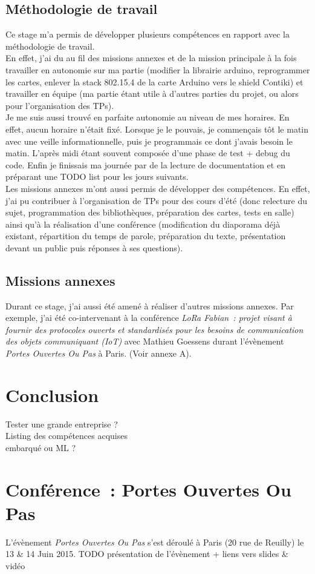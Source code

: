 \documentclass{article}
\begin{document}
\subsection{Méthodologie de travail}
Ce stage m'a permis de développer plusieurs compétences en rapport avec la méthodologie de travail.\\
En effet, j'ai du au fil des missions annexes et de la mission principale à la fois travailler en autonomie sur ma partie (modifier la librairie arduino, reprogrammer les cartes, enlever la stack 802.15.4 de la carte Arduino vers le shield Contiki) et travailler en équipe (ma partie étant utile à d'autres parties du projet, ou alors pour l'organisation des TPs).\\
Je me suis aussi trouvé en parfaite autonomie au niveau de mes horaires. En effet, aucun horaire n'était fixé. Lorsque je le pouvais, je commençais tôt le matin avec une veille informationnelle, puis je programmais ce dont j'avais besoin le matin. L'après midi étant souvent composée d'une phase de test + debug du code. Enfin je finissais ma journée par de la lecture de documentation et en préparant une TODO list pour les jours suivants.\\
Les missions annexes m'ont aussi permis de développer des compétences. En effet, j'ai pu contribuer à l'organisation de TPs pour des cours d'été (donc relecture du sujet, programmation des bibliothèques, préparation des cartes, tests en salle) ainsi qu'à la réalisation d'une conférence (modification du diaporama déjà existant, répartition du temps de parole, préparation du texte, présentation devant un public puis réponses à ses questions).
\subsection{Missions annexes}
Durant ce stage, j'ai aussi été amené à réaliser d'autres missions annexes. Par exemple, j'ai été co-intervenant à la conférence \emph{LoRa Fabian~:  projet visant à fournir des protocoles ouverts et standardisés pour les besoins de communication des objets communiquant (IoT)} avec Mathieu Goessens durant l'évènement \emph{Portes Ouvertes Ou Pas} à Paris. (Voir annexe A).

\section{Conclusion}
Tester une grande entreprise ?\\
Listing des compétences acquises\\
embarqué ou ML ?

\newpage
\appendix
	\section{Conférence~: Portes Ouvertes Ou Pas}
	L'évènement \emph{Portes Ouvertes Ou Pas} s'est déroulé à Paris (20 rue de Reuilly) le 13 \& 14 Juin 2015.
		TODO présentation de l'évènement + liens vers slides \& vidéo
\end{document}
